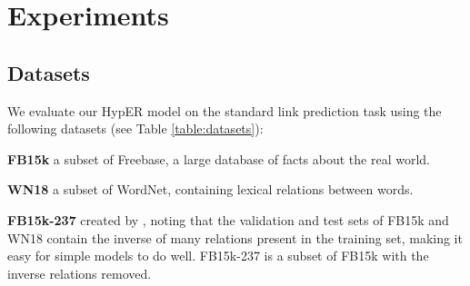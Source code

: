 \documentclass[runningheads]{llncs}
\newcommand{\keypoint}[1]{\vspace{0.1cm}\noindent\textbf{#1}\quad}
\begin{document}
\begin{table}[!htbp]
	\centering
	\caption{Comparison of number of parameters for ConvE and HypER on FB15k-237. $h_m$ and $w_m$ are height and width of the ConvE feature maps respectively.}
     \label{table:params}
      \vspace{-0.3cm}
 \end{table}

\section{Experiments}

\subsection{Datasets}

We evaluate our HypER model on the standard link prediction task using the following datasets (see Table \ref{table:datasets}):

\keypoint{FB15k}  \cite{bordes2013translating} a subset of Freebase, a large database of facts about the real world.

\keypoint{WN18}  \cite{bordes2013translating} a subset of WordNet, containing lexical relations between words.

\keypoint{FB15k-237} created by \cite{toutanova2015representing}, noting that the validation and test sets of FB15k and WN18 contain the inverse of many relations present in the training set, making it easy for simple models to do well. FB15k-237 is a subset of FB15k with the inverse relations removed.
\end{document}
